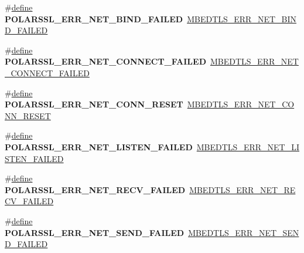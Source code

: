 \begin{DoxyCompactItemize}
\item 
\mbox{\label{compat-1_83_8h_a14395a416f051e26a9918052614b34d8}} 
\#\hyperlink{structdefine}{define} {\bfseries P\+O\+L\+A\+R\+S\+S\+L\+\_\+\+E\+R\+R\+\_\+\+N\+E\+T\+\_\+\+B\+I\+N\+D\+\_\+\+F\+A\+I\+L\+ED}~\hyperlink{net__sockets_8h_a4dbd66233b3f8bdd812f388667fcf123}{M\+B\+E\+D\+T\+L\+S\+\_\+\+E\+R\+R\+\_\+\+N\+E\+T\+\_\+\+B\+I\+N\+D\+\_\+\+F\+A\+I\+L\+ED}
\item 
\mbox{\label{compat-1_83_8h_aa316f63c8e1deda24d3ae1d146854474}} 
\#\hyperlink{structdefine}{define} {\bfseries P\+O\+L\+A\+R\+S\+S\+L\+\_\+\+E\+R\+R\+\_\+\+N\+E\+T\+\_\+\+C\+O\+N\+N\+E\+C\+T\+\_\+\+F\+A\+I\+L\+ED}~\hyperlink{net__sockets_8h_acdd34e19acf5a23c593895605bf3f219}{M\+B\+E\+D\+T\+L\+S\+\_\+\+E\+R\+R\+\_\+\+N\+E\+T\+\_\+\+C\+O\+N\+N\+E\+C\+T\+\_\+\+F\+A\+I\+L\+ED}
\item 
\mbox{\label{compat-1_83_8h_ab25ddd7b1e424e1168226dd268259360}} 
\#\hyperlink{structdefine}{define} {\bfseries P\+O\+L\+A\+R\+S\+S\+L\+\_\+\+E\+R\+R\+\_\+\+N\+E\+T\+\_\+\+C\+O\+N\+N\+\_\+\+R\+E\+S\+ET}~\hyperlink{net__sockets_8h_a1793f099e5c010750c7a07bf259898d9}{M\+B\+E\+D\+T\+L\+S\+\_\+\+E\+R\+R\+\_\+\+N\+E\+T\+\_\+\+C\+O\+N\+N\+\_\+\+R\+E\+S\+ET}
\item 
\mbox{\label{compat-1_83_8h_a943010f94195f2f283a2b3d6ccea5422}} 
\#\hyperlink{structdefine}{define} {\bfseries P\+O\+L\+A\+R\+S\+S\+L\+\_\+\+E\+R\+R\+\_\+\+N\+E\+T\+\_\+\+L\+I\+S\+T\+E\+N\+\_\+\+F\+A\+I\+L\+ED}~\hyperlink{net__sockets_8h_a4bf7cbe6fff470186e4a7a275dde4bdd}{M\+B\+E\+D\+T\+L\+S\+\_\+\+E\+R\+R\+\_\+\+N\+E\+T\+\_\+\+L\+I\+S\+T\+E\+N\+\_\+\+F\+A\+I\+L\+ED}
\item 
\mbox{\label{compat-1_83_8h_a03130c59c475bf1e8a89cf97c28972c6}} 
\#\hyperlink{structdefine}{define} {\bfseries P\+O\+L\+A\+R\+S\+S\+L\+\_\+\+E\+R\+R\+\_\+\+N\+E\+T\+\_\+\+R\+E\+C\+V\+\_\+\+F\+A\+I\+L\+ED}~\hyperlink{net__sockets_8h_a0c95b85b300ddc10a753899ff2f154f2}{M\+B\+E\+D\+T\+L\+S\+\_\+\+E\+R\+R\+\_\+\+N\+E\+T\+\_\+\+R\+E\+C\+V\+\_\+\+F\+A\+I\+L\+ED}
\item 
\mbox{\label{compat-1_83_8h_a6a6129076b6fefa2d730b9173710f1fe}} 
\#\hyperlink{structdefine}{define} {\bfseries P\+O\+L\+A\+R\+S\+S\+L\+\_\+\+E\+R\+R\+\_\+\+N\+E\+T\+\_\+\+S\+E\+N\+D\+\_\+\+F\+A\+I\+L\+ED}~\hyperlink{net__sockets_8h_ad11d72cca1319fd35fb9e73c9428e92d}{M\+B\+E\+D\+T\+L\+S\+\_\+\+E\+R\+R\+\_\+\+N\+E\+T\+\_\+\+S\+E\+N\+D\+\_\+\+F\+A\+I\+L\+ED}

\end{DoxyCompactItemize}
